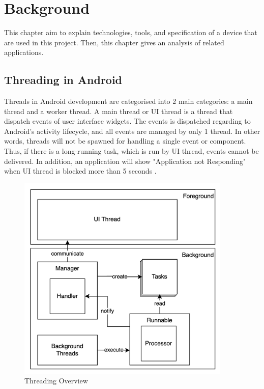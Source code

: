 \chapter{Background}\label{background}

    This chapter aim to explain technologies, tools, and specification of a device that are used in this project.
    Then, this chapter gives an analysis of related applications.

    \section{Threading in Android}
        Threads in Android development are categorised into 2 main categories: a main thread and a worker thread.
        A main thread or UI thread is a thread that dispatch events of user interface widgets.
        The events is dispatched regarding to Android's activity lifecycle,
        and all events are managed by only 1 thread.
        In other words, threads will not be spawned for handling a single event or component.
        Thus, if there is a long-running task, which is run by UI thread, events cannot be delivered.
        In addition, an application will show "Application not Responding"
        when UI thread is blocked more than 5 seconds \cite{ANDROID-01}.

        \begin{figure}[!ht]
            \centering
            \includegraphics[width=4in]{images/chapter2/thread-overview.png}
            \caption{Threading Overview}
            \label{thread-overview}
        \end{figure}

